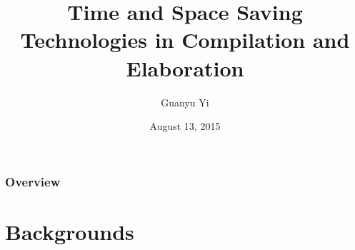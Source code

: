 \documentclass{beamer}
\title[Speeding up Yourself]{Time and Space Saving Technologies in Compilation and Elaboration} %
\author{Guanyu Yi} %
\institute[SPRD] %
{
  Spreadtrum Communications, Inc. \\ %
  \medskip
  \textit{gary3511@gmail.com} %
}
\date{August 13, 2015} %
\begin{document}
\begin{frame}
  \titlepage %
\end{frame}

\begin{frame}
  \frametitle{Overview} %
  \tableofcontents %
\end{frame}


\section{Backgrounds} %

\end{document}
